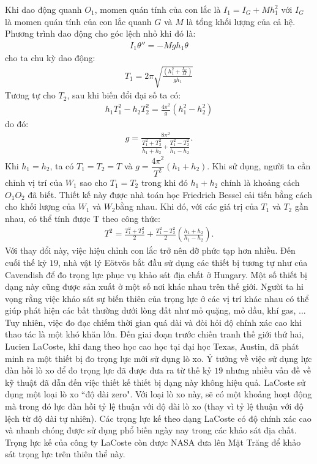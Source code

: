 \begin{multicols}{2}
\begin{figure}[H]
		\vspace*{-10pt}
	\end{figure}
	Khi dao động quanh $O_1$, momen quán tính của con lắc là $I_1=I_G+Mh_1^2$ với $I_G$ là momen quán tính của con lắc quanh $G$ và $M$ là tổng khối lượng của cả hệ. Phương trình dao động cho góc lệch nhỏ khi đó là:
	\begin{align*}
		I_1\theta''=-Mgh_1 \theta
	\end{align*}
	cho ta chu kỳ dao động:
	\begin{align*}
		T_1 = 2\pi \sqrt{\frac{\left(h_1^2 + \frac{I_G}{M}\right)}{gh_1}}
	\end{align*}
	Tương tự cho $T_2$, sau khi biến đổi đại số ta có:
	\begin{align*}
		h_1T_1^2 - h_2T_2^2 = \frac{4 \pi^2}{g}\left(h_1^2 - h_2^2\right)
	\end{align*}
	do đó:
	\begin{align*}
		g = \frac{8\pi^2}{\dfrac{T_1^2 + T_2^2}{h_1 + h_2} + \dfrac{T_1^2 -T_2^2}{h_1 - h_2}}.
	\end{align*}
	Khi $h_1=h_2$, ta có $T_1=T_2=T$ và $g=\dfrac{4\pi^2}{T^2}(h_1+h_2)$.
	\vskip 0.1cm
	Khi sử dụng, người ta cần chỉnh vị trí của $W_1$ sao cho $T_1=T_2$ trong khi đó $h_1+h_2$ chính là khoảng cách $O_1O_2$ đã biết.
	\vskip 0.1cm
	Thiết kế này được nhà toán học Friedrich Bessel cải tiến bằng cách cho khối lượng của $W_1$ và $W_2 $bằng nhau. Khi đó, với các giá trị của $T_1$ và $T_2$ gần nhau, có thể tính được T theo công thức:
	\begin{align*}
		T^2 = \frac{T_1^2 + T_2^2}{2} + \frac{T_1^2 - T_2^2}{2}\left(\frac{h_1 + h_2}{h_1 - h_2}\right).
	\end{align*}
	Với thay đổi này, việc hiệu chỉnh con lắc trở nên đỡ phức tạp hơn nhiều.
	\vskip 0.1cm
	Đến cuối thế kỷ $19$, nhà vật lý Eötvös bắt đầu sử dụng các thiết bị tương tự như của Cavendish để đo trọng lực phục vụ khảo sát địa chất ở Hungary. Một số thiết bị dạng này cũng được sản xuất ở một số nơi khác nhau trên thế giới. Người ta hi vọng rằng việc khảo sát sự biến thiên của trọng lực ở các vị trí khác nhau có thể giúp phát hiện các bất thường dưới lòng đất như mỏ quặng, mỏ dầu, khí gas, ... Tuy nhiên, việc đo đạc chiếm thời gian quá dài và đòi hỏi độ chính xác cao khi thao tác là một khó khăn lớn.
	\vskip 0.1cm
	Đến giai đoạn trước chiến tranh thế giới thứ hai, Lucien LaCoste, khi đang theo học cao học tại đại học Texas, Austin, đã phát minh ra một thiết bị đo trọng lực mới sử dụng lò xo. Ý tưởng về việc sử dụng lực đàn hồi lò xo để đo trọng lực đã được đưa ra từ thế kỷ $19$ nhưng nhiều vấn đề về kỹ thuật đã dẫn đến việc thiết kế thiết bị dạng này không hiệu quả. LaCoste sử dụng một loại lò xo ``độ dài zero". Với loại lò xo này, sẽ có một khoảng hoạt động mà trong đó lực đàn hồi tỷ lệ thuận với độ dài lò xo (thay vì tỷ lệ thuận với độ lệch từ độ dài tự nhiên). Các trọng lực kế theo dạng LaCoste có độ chính xác cao và nhanh chóng được sử dụng phổ biến ngày nay trong các khảo sát địa chất. Trọng lực kế của công ty LaCoste còn được NASA đưa lên Mặt Trăng để khảo sát trọng lực trên thiên thể này.

\end{multicols}
